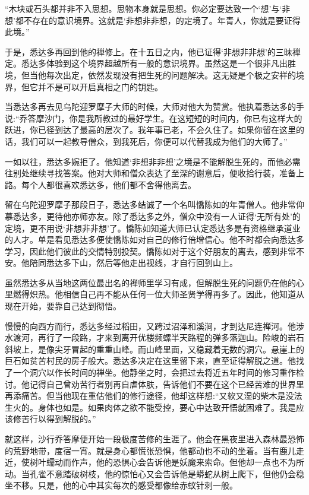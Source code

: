 \documentclass[12pt,twoside,openany]{book}
\begin{document}
“木块或石头都并非不入思想。思物本身就是思想。你必定要达致一个‘想’与‘非想’都不存在的意识境界。这就是‘非想非非想，的定境了。年青人，你就是要证得此境。”

于是，悉达多再回到他的禅修上。在十五日之内，他已证得‘非想非非想’的三昧禅定。悉达多体验到这个境界超越所有一般的意识境界。虽然这是一个很非凡出胜境，但当他每次出定，依然发现没有把生死的问题解决。这无疑是个极之安祥的境界，但它并不是可以开启真相之门的钥匙。

当悉达多再去见乌陀迎罗摩子大师的时候，大师对他大为赞赏。他执着悉达多的手说:“乔答摩沙门，你是我所教过的最好学生。在这短短的时间内，你已有这样大的跃进，你已径到达了最高的层次了。我年事已老，不会久住了。如果你留在这里的话，我们可以一起教导僧众，到我死后，你便可以代替我成为他们的大师了。”

一如以往，悉达多婉拒了。他知道‘非想非非想’之境是不能解脱生死的，而他必需往别处继续寻找答案。他对大师和僧众表达了至深的谢意后，便收拾行装，准备上路。每个人都很喜欢悉达多，他们都不舍得他离去。

留在乌陀迎罗摩子那段日子，悉达多结诚了一个名叫憍陈如的年青僧人。他非常仰慕悉达多，更待他亦师亦友。除了悉达多之外，僧众中没有一人证得‘无所有处’的定境，更不用说‘非想非非想’了。憍陈如知道大师已认定悉达多是有资格继承道业的人才。单是看见悉达多便使憍陈如对自己的修行倍增信心。他不时都会向悉达多学习，因此他们彼此的交情特别投契。憍陈如对于这个好朋友的离去，感到非常不安。他陪同悉达多下山，然后等他走出视线，才自行回到山上。

虽然悉达多从当地这两位最出名的禅师里学习有成，但解脱生死的问题仍在他的心里燃得炽热。他相信自己再不能从任何一位大师圣贤学得再多了。因此，他知道从现在开始，要靠自己达到彻悟。

慢慢的向西方而行，悉达多经过稻田，又跨过沼泽和溪涧，才到达尼连禅河。他涉水渡河，再行了一段路，才来到离开优楼频螺半天路程的弹多落迦山。险峻的岩石斜坡上，是像尖牙冒起的重重山峰。而山峰里面，又稳藏着无数的洞穴。悬崖上的巨石如贫苦村民的房子般大。悉达多决定在这里留下来，直至证得解脱之道。他找了一个洞穴以作长时间的禅坐。他静坐之时，会把过去将近五年时间的修习重作检讨。他记得自己曾劝苦行者别再自虐体肤，告诉他们不要在这个已经苦难的世界里再添痛苦。但当他现在重估他们的修行途径，他却这样想:“又软又湿的柴木是没法生火的。身体也如是。如果肉体之欲不能受控，要心中达致开悟就困难了。我是应该修苦行以得到解脱的。”

就这样，沙行乔答摩便开始一段极度苦修的生涯了。他会在黑夜里进入森林最恐怖的荒野地带，度宿一宵。就是身心都慌张恐惧，他都动也不动的坐着。当有鹿儿走近，使树叶蠕动而作声，他的恐惧心会告诉他是妖魔来索命。但他却一点也不为所动。当孔雀不意踏破树枝，他的惊怕心又会告诉他是蟒蛇从树上爬下，但他仍会稳坐不移。只是，他的心中其实每次的感受都像给赤蚁针刺一般。
\end{document}
